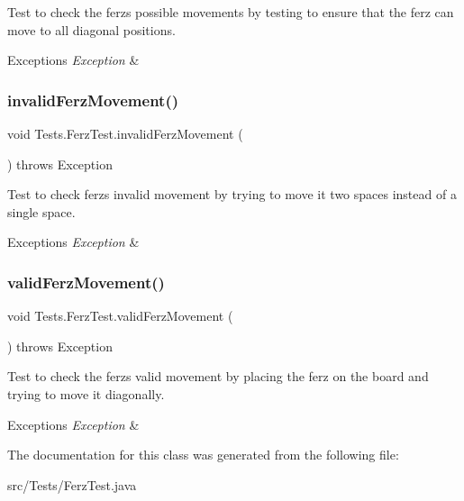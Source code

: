 Test to check the ferz\textquotesingle{}s possible movements by testing to ensure that the ferz can move to all diagonal positions. 
\begin{DoxyExceptions}{Exceptions}
{\em Exception} & \\
\hline
\end{DoxyExceptions}
\hypertarget{class_tests_1_1_ferz_test_af69b9c0b5ea3735d6105c1025ad4f305}{}\label{class_tests_1_1_ferz_test_af69b9c0b5ea3735d6105c1025ad4f305} 
\subsubsection{\texorpdfstring{invalid\+Ferz\+Movement()}{invalidFerzMovement()}}
{\footnotesize\ttfamily void Tests.\+Ferz\+Test.\+invalid\+Ferz\+Movement (\begin{DoxyParamCaption}{ }\end{DoxyParamCaption}) throws Exception}

Test to check ferz\textquotesingle{}s invalid movement by trying to move it two spaces instead of a single space. 
\begin{DoxyExceptions}{Exceptions}
{\em Exception} & \\
\hline
\end{DoxyExceptions}
\hypertarget{class_tests_1_1_ferz_test_ab8577a15a8d3c03a84c2af880bf86d13}{}\label{class_tests_1_1_ferz_test_ab8577a15a8d3c03a84c2af880bf86d13} 
\subsubsection{\texorpdfstring{valid\+Ferz\+Movement()}{validFerzMovement()}}
{\footnotesize\ttfamily void Tests.\+Ferz\+Test.\+valid\+Ferz\+Movement (\begin{DoxyParamCaption}{ }\end{DoxyParamCaption}) throws Exception}

Test to check the ferz\textquotesingle{}s valid movement by placing the ferz on the board and trying to move it diagonally. 
\begin{DoxyExceptions}{Exceptions}
{\em Exception} & \\
\hline
\end{DoxyExceptions}


The documentation for this class was generated from the following file\+:\begin{DoxyCompactItemize}
\item 
src/\+Tests/Ferz\+Test.\+java\end{DoxyCompactItemize}
